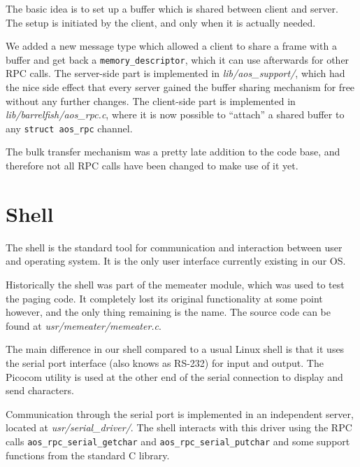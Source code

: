 \documentclass[a4paper,10pt]{article}
\newcommand{\filepath}[1]{\emph{ #1}}
\begin{document}
The basic idea is to set up a buffer which is shared between client and server.
The setup is initiated by the client, and only when it is actually needed.

We added a new message type which allowed a client to share a frame with a buffer and get back a \lstinline!memory_descriptor!, which it can use afterwards for other RPC calls.
The server-side part is implemented in \filepath{lib/aos\_support/}, which had the nice side effect that every server gained the buffer sharing mechanism for free without any further changes.
The client-side part is implemented in \filepath{lib/barrelfish/aos\_rpc.c}, where it is now possible to ``attach'' a shared buffer to any \lstinline!struct aos_rpc! channel.

The bulk transfer mechanism was a pretty late addition to the code base, and therefore not all RPC calls have been changed to make use of it yet.

\section{Shell}
The shell is the standard tool for communication and interaction between user and operating system.
It is the only user interface currently existing in our OS.
  
Historically the shell was part of the memeater module, which was used to test the paging code.
It completely lost its original functionality at some point however, and the only thing remaining is the name.
The source code can be found at \filepath{usr/memeater/memeater.c}.

The main difference in our shell compared to a usual Linux shell is that it uses the serial port interface (also knows as RS-232) for input and output.
The Picocom \cite{web:picocom}
 utility is used at the other end of the serial connection to display and send characters.

Communication through the serial port is implemented in an independent server, located at \filepath{usr/serial\_driver/}.
The shell interacts with this driver using the RPC calls \lstinline!aos_rpc_serial_getchar! and \lstinline!aos_rpc_serial_putchar! and some support functions from the standard C library.
\end{document}
